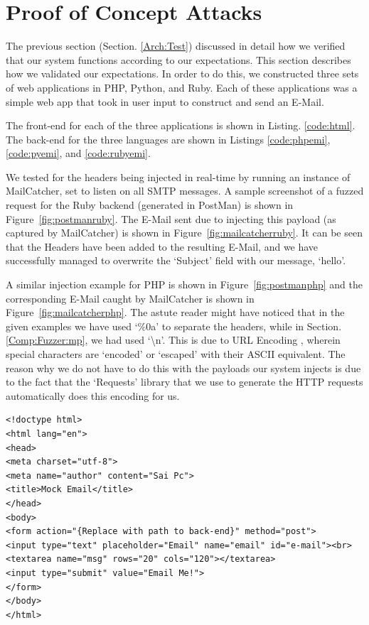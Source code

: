\section{Proof of Concept Attacks}
The previous section (Section. \ref{Arch:Test}) discussed in detail how we verified that our system functions according to our expectations. This section describes how we validated our expectations. In order to do this, we constructed three sets of web applications in PHP, Python, and Ruby. Each of these applications was a simple web app that took in user input to construct and send an E-Mail.

The front-end for each of the three applications is shown in Listing. \ref{code:html}. The back-end for the three languages are shown in Listings \ref{code:phpemi}, \ref{code:pyemi}, and \ref{code:rubyemi}.

We tested for the headers being injected in real-time by running an instance of MailCatcher, set to listen on all SMTP messages. A sample screenshot of a fuzzed request for the Ruby backend (generated in PostMan) is shown in Figure~\ref{fig:postmanruby}. The E-Mail sent due to injecting this payload (as captured by MailCatcher) is shown in Figure~\ref{fig:mailcatcherruby}. It can be seen that the Headers have been added to the resulting E-Mail, and we have successfully managed to overwrite the `Subject' field with our message, `hello'.

A similar injection example for PHP is shown in Figure~\ref{fig:postmanphp} and the corresponding E-Mail caught by MailCatcher is shown in Figure~\ref{fig:mailcatcherphp}. The astute reader might have noticed that in the given examples we have used `\%0a' to separate the headers, while in Section. \ref{Comp:Fuzzer:mp}, we had used `\textbackslash{}n'. This is due to URL Encoding \cite{rfc1738}, wherein special characters are `encoded' or `escaped' with their ASCII equivalent.
The reason why we do not have to do this with the payloads our system injects is due to the fact that the `Requests' library that we use to generate the HTTP requests automatically does this encoding for us.

\begin{lstlisting}
<!doctype html>
<html lang="en">
<head>
<meta charset="utf-8">
<meta name="author" content="Sai Pc">
<title>Mock Email</title>
</head>
<body>
<form action="{Replace with path to back-end}" method="post">
<input type="text" placeholder="Email" name="email" id="e-mail"><br>
<textarea name="msg" rows="20" cols="120"></textarea>
<input type="submit" value="Email Me!">
</form>
</body>
</html>
\end{lstlisting}

